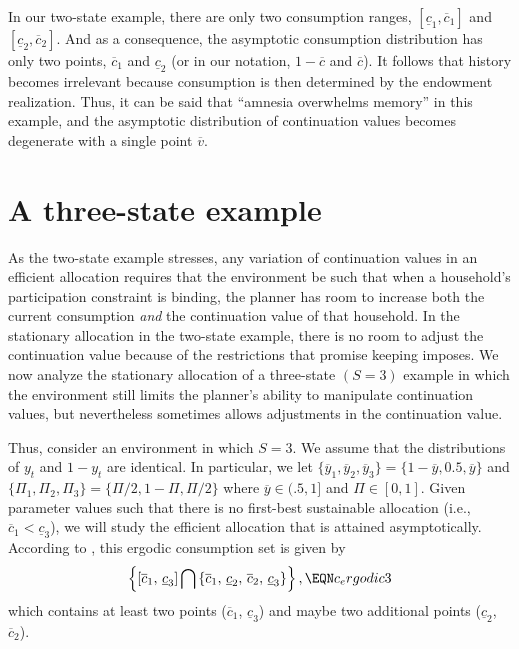 In  our two-state example, there are only two
consumption ranges, $[\underline c_1, \overline c_1]$ and
$[\underline c_2, \overline c_2]$. And as a consequence, the
asymptotic consumption distribution has only two points,
$\overline c_1$ and $\underline c_2$ (or in our notation,
$1-\overline c$ and $\overline c$). It follows that history
becomes  irrelevant because consumption is then determined by the
endowment realization. Thus, it can be said that ``amnesia
overwhelms memory'' in this example, and the asymptotic
distribution of continuation values becomes degenerate with a
single point $\overline v$.
%
%



\section{A three-state example}\label{sec:3state}%
As the two-state example stresses, any variation of continuation values
in an efficient allocation requires that
 the environment be such that when a household's participation constraint
is binding, the planner has room to increase both the current
consumption {\it and\/} the continuation value of that household.
In the stationary allocation in the two-state example, there is no
room to adjust the continuation value because of the restrictions
that promise keeping imposes. We now analyze the stationary
allocation of a three-state $(S=3)$ example in which
the environment still limits the planner's ability to manipulate
continuation values, but nevertheless sometimes allows adjustments
in the continuation value.


\newpage
Thus, consider an environment in which $S=3$. We assume
that the distributions of $y_t$ and $1-y_t$ are identical.  In particular,
we let $\{\overline y_1,\overline y_2,\overline y_3\}=
\{1-\overline y, 0.5, \overline y\}$ and
$\{\Pi_1, \Pi_2, \Pi_3\}=\{\Pi/2, 1-\Pi, \Pi/2\}$ where
$\overline y\in(.5, 1]$ and $\Pi\in[0,1]$.
Given parameter values such that there is no first-best
sustainable allocation
(i.e., $\overline c_1 < \underline c_3$),
we will study the efficient allocation that is attained
asymptotically. According to , this ergodic
consumption set is given by
$$
\left\{\left[\overline c_1,\, \underline c_3\right]
\bigcap \, \{\overline c_1,\, \underline c_2,\, \overline c_2,
           \, \underline c_3\} \right\}, \EQN c_ergodic3
$$
which contains at least two points ($\overline c_1$, $\underline c_3$)
and maybe two additional points ($\underline c_2$, $\overline c_2$).

